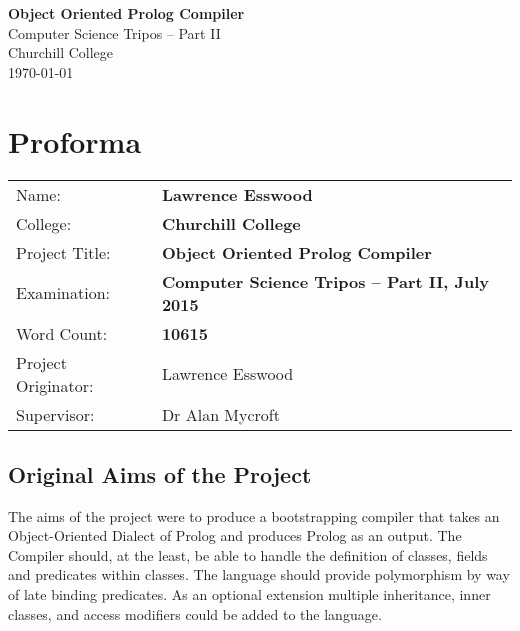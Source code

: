 \documentclass[12pt,a4paper,twoside,openright]{report}
\begin{document}
\EnableBpAbbreviations
\makeatletter \renewcommand{\@cite}[1]{\textsuperscript{\,[#1]}} \makeatother





\pagestyle{empty}


\vspace*{60mm}
\begin{center}
\Huge
\textbf{Object Oriented Prolog Compiler} \\[5mm]
Computer Science Tripos -- Part II \\[5mm]
Churchill College \\[5mm]
\today  %
\end{center}



\pagestyle{plain}

\chapter*{Proforma}

{\large
\begin{tabular}{ll}
Name:               & \bf Lawrence Esswood                       \\
College:            & \bf Churchill College                     \\
Project Title:      & \bf Object Oriented Prolog Compiler \\
Examination:        & \bf Computer Science Tripos -- Part II, July 2015  \\
Word Count:         & \bf 10615 \\
Project Originator: & Lawrence Esswood                    \\
Supervisor:         & Dr Alan Mycroft                    \\ 
\end{tabular}
}


\section*{Original Aims of the Project}

The aims of the project were to produce a bootstrapping compiler that takes an Object-Oriented Dialect of Prolog and produces Prolog as an output. The Compiler should, at the least, be able to handle the definition of classes, fields and predicates within classes. The language should provide polymorphism by way of late binding predicates. As an optional extension multiple inheritance, inner classes, and access modifiers could be added to the language.
\end{document}
